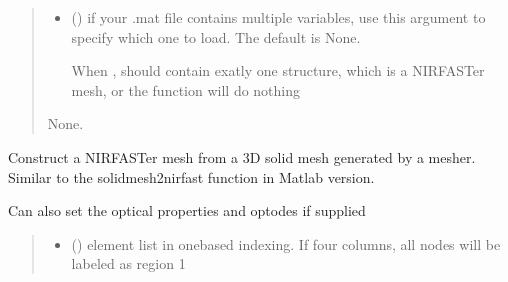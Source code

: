 \documentclass[letterpaper,10pt,english]{sphinxmanual}
\begin{document}
\begin{fulllineitems}
\begin{fulllineitems}
\begin{quote}
\begin{description}
\begin{itemize}
\item {} 
\sphinxAtStartPar
{} (\sphinxstyleliteralemphasis{\sphinxupquote{, }}) \textendash{} 
\sphinxAtStartPar
if your .mat file contains multiple variables, use this argument to specify which one to load. The default is None.

\sphinxAtStartPar
When ,  should contain exatly one structure, which is a NIRFASTer mesh, or the function will do nothing


\end{itemize}

\sphinxAtStartPar
None.

\end{description}\end{quote}

\end{fulllineitems}


\begin{fulllineitems}
\label{\detokenize{_autosummary/nirfasterff.base.dcs_mesh.dcsmesh:nirfasterff.base.dcs_mesh.dcsmesh.from_solid}}
\pysigstartsignatures
\pysiglinewithargsret
{}
{\sphinxparamcomma {}\sphinxparamcomma {}\sphinxparamcomma {}\sphinxparamcomma {}\sphinxparamcomma {}}
{}
\pysigstopsignatures
\sphinxAtStartPar
Construct a NIRFASTer mesh from a 3D solid mesh generated by a mesher. Similar to the solidmesh2nirfast function in Matlab version.

\sphinxAtStartPar
Can also set the optical properties and optodes if supplied
\begin{quote}\begin{description}
\begin{itemize}
\item {} 
\sphinxAtStartPar
{} () \textendash{} 
\sphinxAtStartPar
element list in one\sphinxhyphen{}based indexing. If four columns, all nodes will be labeled as region 1


\end{itemize}
\end{description}
\end{quote}
\end{fulllineitems}
\end{fulllineitems}
\end{document}
